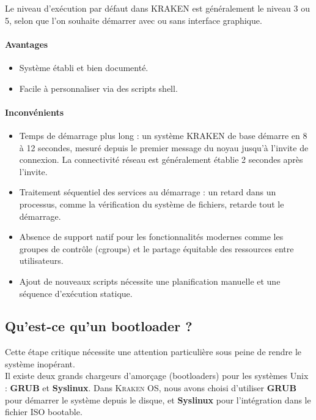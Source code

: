 Le niveau d'exécution par défaut dans KRAKEN est généralement le niveau 3 ou 5, selon que l'on souhaite démarrer avec ou sans interface graphique.

\paragraph{Avantages}

\begin{itemize}
  \item Système établi et bien documenté.
  \item Facile à personnaliser via des scripts shell.
\end{itemize}

\paragraph{Inconvénients}

\begin{itemize}
  \item Temps de démarrage plus long : un système KRAKEN de base démarre en 8 à 12 secondes, mesuré depuis le premier message du noyau jusqu'à l'invite de connexion. La connectivité réseau est généralement établie 2 secondes après l'invite.
  \item Traitement séquentiel des services au démarrage : un retard dans un processus, comme la vérification du système de fichiers, retarde tout le démarrage.
  \item Absence de support natif pour les fonctionnalités modernes comme les groupes de contrôle (cgroups) et le partage équitable des ressources entre utilisateurs.
  \item Ajout de nouveaux scripts nécessite une planification manuelle et une séquence d'exécution statique.
\end{itemize}

\subsection{Qu'est-ce qu'un bootloader ?}
Cette étape critique nécessite une attention particulière sous peine de rendre le système inopérant.\\
Il existe deux grands chargeurs d'amorçage (bootloaders) pour les systèmes Unix : \textbf{GRUB} et \textbf{Syslinux}.  
Dans \textsc{Kraken OS}, nous avons choisi d’utiliser \textbf{GRUB} pour démarrer le système depuis le disque, et \textbf{Syslinux} pour l’intégration dans le fichier ISO bootable.  

